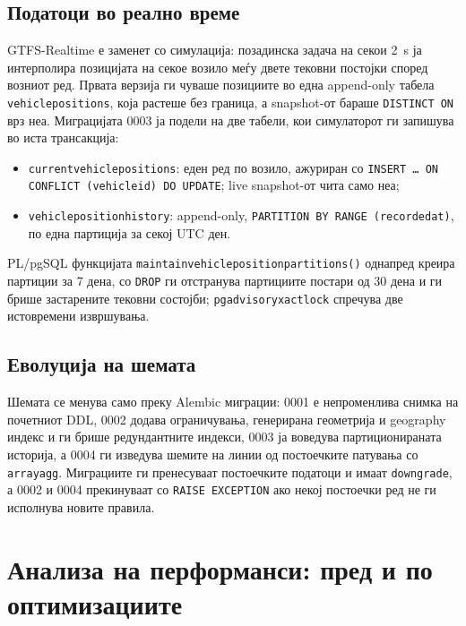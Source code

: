 \documentclass[11pt, a4paper]{article}
\renewcommand{\_}{\oldunderscore\allowbreak}
\newcommand{\code}[1]{\texttt{#1}}
\begin{document}
\subsection{Податоци во реално време}

GTFS-Realtime е заменет со симулација: позадинска задача на секои 2~s ја интерполира позицијата на секое возило меѓу двете тековни постојки според возниот ред. Првата верзија ги чуваше позициите во една append-only табела \code{vehicle\_positions}, која растеше без граница, а snapshot-от бараше \code{DISTINCT ON} врз неа. Миграцијата 0003 ја подели на две табели, кои симулаторот ги запишува во иста трансакција:
\begin{itemize}
    \item \code{current\_vehicle\_positions}: еден ред по возило, ажуриран со \code{INSERT \ldots{} ON CONFLICT (vehicle\_id) DO UPDATE}; live snapshot-от чита само неа;
    \item \code{vehicle\_position\_history}: append-only, \code{PARTITION BY RANGE (recorded\_at)}, по една партиција за секој UTC ден.
\end{itemize}
PL/pgSQL функцијата \code{maintain\_vehicle\_position\_partitions()} однапред креира партиции за 7 дена, со \code{DROP} ги отстранува партициите постари од 30 дена и ги брише застарените тековни состојби; \code{pg\_advisory\_xact\_lock} спречува две истовремени извршувања.

\subsection{Еволуција на шемата}

Шемата се менува само преку Alembic миграции: 0001 е непроменлива снимка на почетниот DDL, 0002 додава ограничувања, генерирана геометрија и geography индекс и ги брише редундантните индекси, 0003 ја воведува партиционираната историја, а 0004 ги изведува шемите на линии од постоечките патувања со \code{array\_agg}. Миграциите ги пренесуваат постоечките податоци и имаат \code{downgrade}, а 0002 и 0004 прекинуваат со \code{RAISE EXCEPTION} ако некој постоечки ред не ги исполнува новите правила.

\section{Анализа на перформанси: пред и по оптимизациите}
\label{sec:perf}
\end{document}
